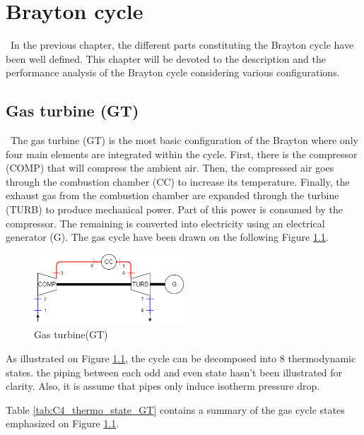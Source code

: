 \graphicspath{{Chapter_4_-_Brayton_cycle/Images/}}
\chapter{Brayton cycle}\label{Brayton cycle}
\quad\, In the previous chapter, the different parts constituting the Brayton cycle have been well defined. This chapter will be devoted to the description and the performance analysis of the Brayton cycle considering various configurations.

\section{Gas turbine (GT)}
\quad\, The gas turbine (GT) is the most basic configuration of the Brayton where only four main elements are integrated within the cycle. First, there is the compressor (COMP) that will compress the ambient air. Then, the compressed air goes through the combustion chamber (CC) to increase its temperature. Finally, the exhaust gas from the combustion chamber are expanded through the turbine (TURB) to produce mechanical power. Part of this power is consumed by the compressor. The remaining is converted into electricity using an electrical generator (G). The gas cycle have been drawn on the following Figure \ref{fig:C4_BraytonGT}.

\begin{figure}[h]
\centering
\includegraphics[width=0.5\textwidth]{GT}
\caption{Gas turbine(GT)}
\label{fig:C4_BraytonGT}
\end{figure}



As illustrated on Figure \ref{fig:C4_BraytonGT}, the cycle can be decomposed into 8 thermodynamic states. the piping between each odd and even state hasn't been illustrated for clarity. Also, it is assume that pipes only induce isotherm pressure drop.

Table \ref{tab:C4_thermo_state_GT} contains a summary of the gas cycle states emphasized on Figure \ref{fig:C4_BraytonGT}.

